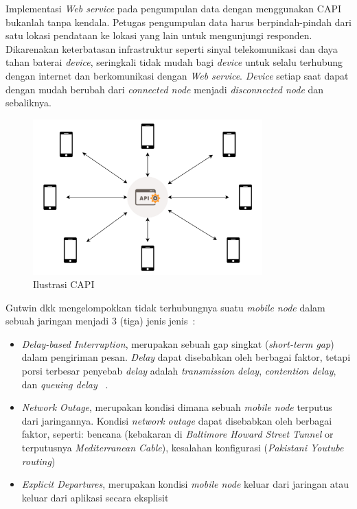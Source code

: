 Implementasi \textit{Web service} pada pengumpulan data dengan menggunakan CAPI bukanlah tanpa kendala. Petugas pengumpulan data harus berpindah-pindah dari satu lokasi pendataan ke lokasi yang lain untuk mengunjungi responden. Dikarenakan keterbatasan infrastruktur seperti sinyal telekomunikasi dan daya tahan baterai \textit{device}, seringkali tidak mudah bagi \textit{device} untuk selalu terhubung dengan internet dan berkomunikasi dengan \textit{Web service}. \textit{Device} setiap saat dapat dengan mudah berubah dari \textit{connected node} menjadi \textit{disconnected node} dan sebaliknya. 

\begin{figure}[h]
    \centering
    \includegraphics[height=6cm]{../../Resources/Images/capi-ilustration}
    \caption{Ilustrasi CAPI}
    \label{fig:capi-ilustration}
\end{figure}

Gutwin dkk mengelompokkan tidak terhubungnya suatu \textit{mobile node} dalam sebuah jaringan menjadi 3 (tiga) jenis jenis~\cite{gutwin_gone_2010}:
\begin{itemize}
\item \textit{Delay-based Interruption}, merupakan sebuah gap singkat (\textit{short-term gap}) dalam pengiriman pesan. \textit{Delay} dapat disebabkan oleh berbagai faktor, tetapi porsi terbesar penyebab \textit{delay} adalah \textit{transmission delay}, \textit{contention delay}, dan \textit{queuing delay} ~\cite{zhang_interference-based_2015}.
\item \textit{Network Outage}, merupakan kondisi dimana sebuah \textit{mobile node} terputus dari jaringannya. Kondisi \textit{network outage} dapat disebabkan oleh berbagai faktor, seperti: bencana (kebakaran di \textit{Baltimore Howard Street Tunnel} or terputusnya \textit{Mediterranean Cable}), kesalahan konfigurasi (\textit{Pakistani Youtube routing})
\item \textit{Explicit Departures}, merupakan kondisi \textit{mobile node} keluar dari jaringan atau keluar dari aplikasi secara eksplisit
\end{itemize}

